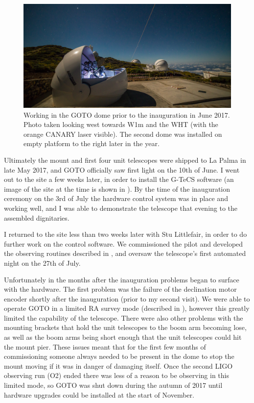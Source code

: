 \begin{colsection}
\begin{figure}[t]
    \begin{center}
        \includegraphics[width=\linewidth]{images/inauguration_photo.jpg}
    \end{center}
    \caption[Working in the GOTO dome prior to the inauguration in June 2017]{
        Working in the GOTO dome prior to the inauguration in June 2017.
        Photo taken looking west towards W1m and the WHT (with the orange CANARY laser visible). The second dome was installed on empty platform to the right later in the year.
    }\label{fig:inauguration}
\end{figure}

Ultimately the mount and first four unit telescopes were shipped to La Palma in late May 2017, and GOTO officially saw first light on the 10th of June. I went out to the site a few weeks later, in order to install the G-TeCS software (an image of the site at the time is shown in ). By the time of the inauguration ceremony on the 3rd of July the hardware control system was in place and working well, and I was able to demonstrate the telescope that evening to the assembled dignitaries.

I returned to the site less than two weeks later with Stu Littlefair, in order to do further work on the control software. We commissioned the pilot and developed the observing routines described in , and oversaw the telescope's first automated night on the 27th of July.

Unfortunately in the months after the inauguration problems began to surface with the hardware. The first problem was the failure of the declination motor encoder shortly after the inauguration (prior to my second visit). We were able to operate GOTO in a limited RA survey mode (described in ), however this greatly limited the capability of the telescope. There were also other problems with the mounting brackets that hold the unit telescopes to the boom arm becoming lose, as well as the boom arms being short enough that the unit telescopes could hit the mount pier. These issues meant that for the first few months of commissioning someone always needed to be present in the dome to stop the mount moving if it was in danger of damaging itself. Once the second LIGO observing run (O2) ended there was less of a reason to be observing in this limited mode, so GOTO was shut down during the autumn of 2017 until hardware upgrades could be installed at the start of November.


\end{colsection}
